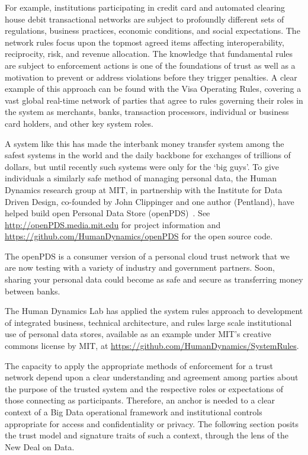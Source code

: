 For example, institutions participating in credit card and automated clearing house debit transactional networks are subject to profoundly different sets of regulations, business practices, economic conditions, and social expectations.
The network rules focus upon the topmost agreed items affecting interoperability, reciprocity, risk, and revenue allocation.
The knowledge that fundamental rules are subject to enforcement actions is one of the foundations of trust as well as a motivation to prevent or address violations before they trigger penalties. 
A clear example of this approach can be found with the Visa Operating Rules, covering a vast global real-time network of parties that agree to rules governing their roles in the system as merchants, banks, transaction processors, individual or business card holders, and other key system roles.

A system like this has made the interbank money transfer system among the safest systems in the world and the daily backbone for exchanges of trillions of dollars, but until recently such systems were only for the `big guys'.
To give individuals a similarly safe method of managing personal data, the Human Dynamics research group at MIT, in partnership with the Institute for Data Driven Design, co-founded by John Clippinger and one author (Pentland), have helped build open Personal Data Store (openPDS)~\cite{de2012trusted}. See \url{http://openPDS.media.mit.edu} for project information and \url{https://github.com/HumanDynamics/openPDS} for the open source code.

The openPDS is a consumer version of a personal cloud trust network that we are now testing with a variety of industry and government partners.
Soon, sharing your personal data could become as safe and secure as transferring money between banks.

The Human Dynamics Lab has applied the system rules approach to development of integrated business, technical architecture, and rules large scale institutional use of personal data stores, available as an example under MIT's creative commons license by MIT, at \url{https://github.com/HumanDynamics/SystemRules}. 

The capacity to apply the appropriate methods of enforcement for a trust network depend upon a clear understanding and agreement among parties about the purpose of the trusted system and the respective roles or expectations of those connecting as participants.
Therefore, an anchor is needed to a clear context of a Big Data operational framework and institutional controls appropriate for access and confidentiality or privacy.
The following section posits the trust model and signature traits of such a context, through the lens of the New Deal on Data.

